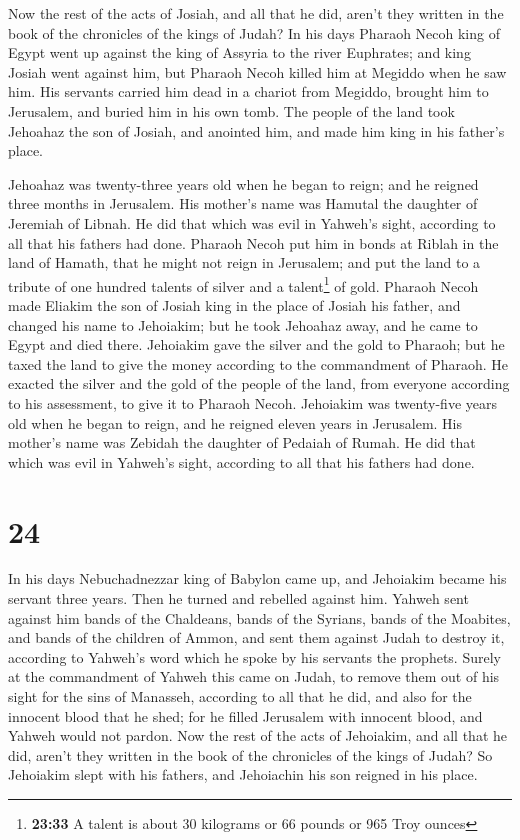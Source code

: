  Now the rest of the acts of Josiah, and all that he did,
aren't they written in the book of the chronicles of the kings of Judah?
 In his days Pharaoh Necoh king of Egypt went up against
the king of Assyria to the river Euphrates; and king Josiah went against
him, but Pharaoh Necoh killed him at Megiddo when he saw him.
 His servants carried him dead in a chariot from Megiddo,
brought him to Jerusalem, and buried him in his own tomb. The people of
the land took Jehoahaz the son of Josiah, and anointed him, and made him
king in his father's place.

 Jehoahaz was twenty-three years old when he began to
reign; and he reigned three months in Jerusalem. His mother's name was
Hamutal the daughter of Jeremiah of Libnah.  He did that
which was evil in Yahweh's sight, according to all that his fathers had
done.  Pharaoh Necoh put him in bonds at Riblah in the
land of Hamath, that he might not reign in Jerusalem; and put the land
to a tribute of one hundred talents of silver and a talent\footnote{\textbf{23:33}
  A talent is about 30 kilograms or 66 pounds or 965 Troy ounces} of
gold.  Pharaoh Necoh made Eliakim the son of Josiah king
in the place of Josiah his father, and changed his name to Jehoiakim;
but he took Jehoahaz away, and he came to Egypt and died there.
 Jehoiakim gave the silver and the gold to Pharaoh; but
he taxed the land to give the money according to the commandment of
Pharaoh. He exacted the silver and the gold of the people of the land,
from everyone according to his assessment, to give it to Pharaoh Necoh.
 Jehoiakim was twenty-five years old when he began to
reign, and he reigned eleven years in Jerusalem. His mother's name was
Zebidah the daughter of Pedaiah of Rumah.  He did that
which was evil in Yahweh's sight, according to all that his fathers had
done.

\hypertarget{section-23}{%
\section{24}\label{section-23}}

 In his days Nebuchadnezzar king of Babylon came up, and
Jehoiakim became his servant three years. Then he turned and rebelled
against him.  Yahweh sent against him bands of the
Chaldeans, bands of the Syrians, bands of the Moabites, and bands of the
children of Ammon, and sent them against Judah to destroy it, according
to Yahweh's word which he spoke by his servants the prophets.
 Surely at the commandment of Yahweh this came on Judah,
to remove them out of his sight for the sins of Manasseh, according to
all that he did,  and also for the innocent blood that he
shed; for he filled Jerusalem with innocent blood, and Yahweh would not
pardon.  Now the rest of the acts of Jehoiakim, and all
that he did, aren't they written in the book of the chronicles of the
kings of Judah?  So Jehoiakim slept with his fathers, and
Jehoiachin his son reigned in his place.

